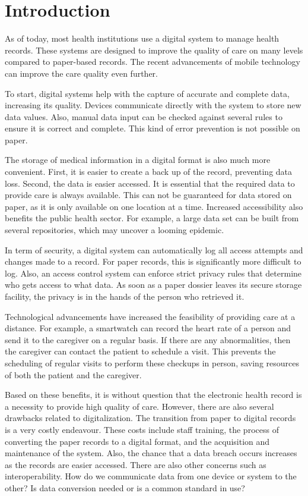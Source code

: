 \section{Introduction}

As of today, most health institutions use a digital system to manage health records. These systems are designed to improve the quality of care on many levels compared to paper-based records. The recent advancements of mobile technology can improve the care quality even further.

To start, digital systems help with the capture of accurate and complete data, increasing its quality. Devices communicate directly with the system to store new data values. Also, manual data input can be checked against several rules to ensure it is correct and complete. This kind of error prevention is not possible on paper.

The storage of medical information in a digital format is also much more convenient. First, it is easier to create a back up of the record, preventing data loss. Second, the data is easier accessed. It is essential that the required data to provide care is always available. This can not be guaranteed for data stored on paper, as it is only available on one location at a time. Increased accessibility also benefits the public health sector. For example, a large data set can be built from several repositories, which may uncover a looming epidemic.

In term of security, a digital system can automatically log all access attempts and changes made to a record. For paper records, this is significantly more difficult to log. Also, an access control system can enforce strict privacy rules that determine who gets access to what data. As soon as a paper dossier leaves its secure storage facility, the privacy is in the hands of the person who retrieved it.

Technological advancements have increased the feasibility of providing care at a distance. For example, a smartwatch can record the heart rate of a person and send it to the caregiver on a regular basis. If there are any abnormalities, then the caregiver can contact the patient to schedule a visit. This prevents the scheduling of regular visits to perform these checkups in person, saving resources of both the patient and the caregiver.

Based on these benefits, it is without question that the electronic health record is a necessity to provide high quality of care. However, there are also several drawbacks related to digitalization. The transition from paper to digital records is a very costly endeavour. These costs include staff training, the process of converting the paper records to a digital format, and the acquisition and maintenance of the system. Also, the chance that a data breach occurs increases as the records are easier accessed. There are also other concerns such as interoperability. How do we communicate data from one device or system to the other? Is data conversion needed or is a common standard in use?

